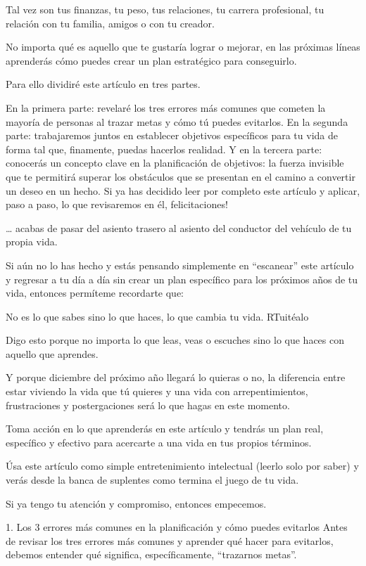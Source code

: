 \documentclass[12pt]{book}
\begin{document}
Tal vez son tus finanzas, tu peso, tus relaciones, tu carrera profesional, tu relación con tu familia, amigos o con tu creador.

No importa qué es aquello que te gustaría lograr o mejorar, en las próximas líneas aprenderás cómo puedes crear un plan estratégico para conseguirlo.


Para ello dividiré este artículo en tres partes.

En la primera parte: revelaré los tres errores más comunes que cometen la mayoría de personas al trazar metas y cómo tú puedes evitarlos.
En la segunda parte: trabajaremos juntos en establecer objetivos específicos para tu vida de forma tal que, finamente, puedas hacerlos realidad.
Y en la tercera parte: conocerás un concepto clave en la planificación de objetivos: la fuerza invisible que te permitirá superar los obstáculos que se presentan en el camino a convertir un deseo en un hecho.
Si ya has decidido leer por completo este artículo y aplicar, paso a paso, lo que revisaremos en él, felicitaciones!

… acabas de pasar del asiento trasero al asiento del conductor del vehículo de tu propia vida.

Si aún no lo has hecho y estás pensando simplemente en “escanear” este artículo y regresar a tu día a día sin crear un plan específico para los próximos años de tu vida, entonces permíteme recordarte que:

No es lo que sabes sino lo que haces, lo que cambia tu vida. RTuitéalo

Digo esto porque no importa lo que leas, veas o escuches sino lo que haces con aquello que aprendes.

Y porque diciembre del próximo año llegará lo quieras o no, la diferencia entre estar viviendo la vida que tú quieres y una vida con arrepentimientos, frustraciones y postergaciones será lo que hagas en este momento.

Toma acción en lo que aprenderás en este artículo y tendrás un plan real, específico y efectivo para acercarte a una vida en tus propios términos.

Úsa este artículo como simple entretenimiento intelectual (leerlo solo por saber) y verás desde la banca de suplentes como termina el juego de tu vida.

Si ya tengo tu atención y compromiso, entonces empecemos.

1. Los 3 errores más comunes en la planificación y cómo puedes evitarlos
Antes de revisar los tres errores más comunes y aprender qué hacer para evitarlos, debemos entender qué significa, específicamente, “trazarnos metas”.
\end{document}
